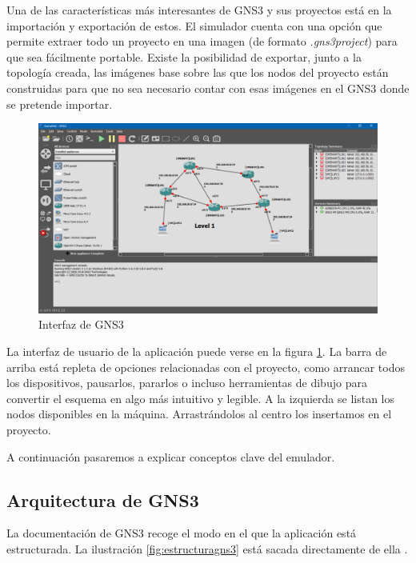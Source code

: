 Una de las características más interesantes de GNS3 y sus proyectos está en la importación y exportación de estos. El simulador cuenta con una opción que permite extraer todo un proyecto en una imagen (de formato \textit{.gns3project}) para que sea fácilmente portable. Existe la posibilidad de exportar, junto a la topología creada, las imágenes base sobre las que los nodos del proyecto están construidas para que no sea necesario contar con esas imágenes en el GNS3 donde se pretende importar.

\begin{figure}[h]
  \centering
  \includegraphics[scale=0.15]{imagenes/interfazgns}
  \caption{Interfaz de GNS3}
  \label{fig:interfazgns}
\end{figure}

La interfaz de usuario de la aplicación puede verse en la figura \ref{fig:interfazgns}. La barra de arriba está repleta de opciones relacionadas con el proyecto, como arrancar todos los dispositivos, pausarlos, pararlos o incluso herramientas de dibujo para convertir el esquema en algo más intuitivo y legible. A la izquierda se listan los nodos disponibles en la máquina. Arrastrándolos al centro los insertamos en el proyecto.

A continuación pasaremos a explicar conceptos clave del emulador.

\subsection{Arquitectura de GNS3}
La documentación de GNS3 recoge el modo en el que la aplicación está estructurada. La ilustración \ref{fig:estructuragns3} está sacada directamente de ella \cite{structuregns3}.


